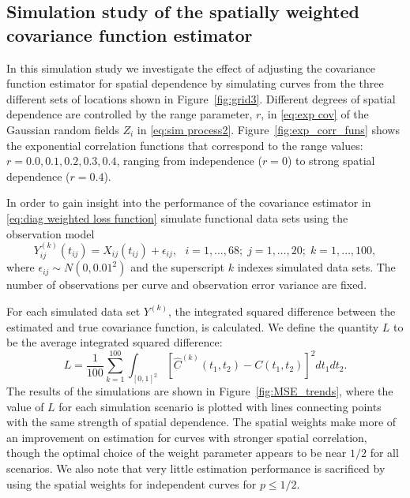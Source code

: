 \subsection{Simulation study of the spatially weighted covariance function estimator} %
\label{sub:simulation covariance}

In this simulation study we investigate the effect of adjusting the covariance function estimator for spatial dependence by simulating curves from the three different sets of locations shown in Figure~\ref{fig:grid3}. Different degrees of spatial dependence are controlled by the range parameter, $r$, in \eqref{eq:exp cov} of the Gaussian random fields $Z_i$ in \eqref{eq:sim process2}. Figure~\ref{fig:exp_corr_funs} shows the exponential correlation functions that correspond to the range values: $r = 0.0, 0.1, 0.2, 0.3, 0.4$, ranging from independence ($r = 0$) to strong spatial dependence ($r = 0.4$).

In order to gain insight into the performance of the covariance estimator in \eqref{eq:diag weighted loss function} simulate functional data sets using the observation model 
\begin{equation}
	Y^{(k)}_{ij}(t_{ij}) = X_{ij}(t_{ij}) + \epsilon_{ij}, \mbox{ } i = 1, \dots, 68;\; j = 1, \dots, 20;\; k = 1, \dots, 100,
\end{equation}
where $\epsilon_{ij} \sim N(0, 0.01^2)$ and the superscript $k$ indexes simulated data sets. The number of observations per curve and observation error variance are fixed. 

For each simulated data set $Y^{(k)}$, the integrated squared difference between the estimated and true covariance function, is calculated. We define the quantity $L$ to be the average integrated squared difference:
\begin{equation}
	L = \frac{1}{100}\sum_{k=1}^{100}\int_{[0,1]^2} [\hat{C}^{(k)}(t_1, t_2) - C(t_1,t_2)]^2dt_1dt_2.
\end{equation}
The results of the simulations are shown in Figure~\ref{fig:MSE_trends}, where the value of $L$ for each simulation scenario is plotted with lines connecting points with the same strength of spatial dependence. The spatial weights make more of an improvement on estimation for curves with stronger spatial correlation, though the optimal choice of the weight parameter appears to be near $1/2$ for all scenarios. We also note that very little estimation performance is sacrificed by using the spatial weights for independent curves for $p \leq 1/2$.

